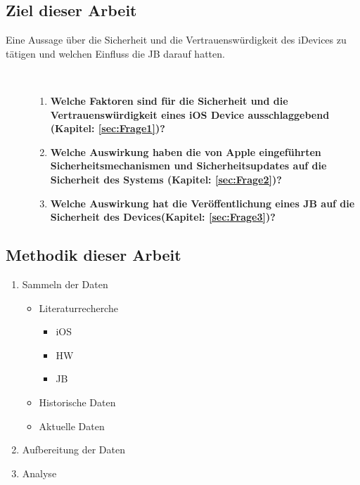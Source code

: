 \subsection{Ziel dieser Arbeit}
\label{sec:IntroZiel}
Eine Aussage über die Sicherheit und die Vertrauenswürdigkeit des iDevices zu tätigen 
und welchen Einfluss die JB darauf hatten.
    \begin{description}
        \item[\parbox{\textwidth} {Daraus ergeben sich folgende Fragestellungen}]~\par
            \begin{enumerate}
                \item \label{frage:1} \textbf{Welche Faktoren sind für die Sicherheit und die Vertrauenswürdigkeit eines iOS Device ausschlaggebend (Kapitel: \ref{sec:Frage1})? } 
                    
            \item \label{frage:2}\textbf{Welche Auswirkung haben die von Apple eingeführten Sicherheitsmechanismen und Sicherheitsupdates auf die Sicherheit des Systems (Kapitel: \ref{sec:Frage2})?} 
            
            \item \label{frage:3}\textbf{Welche Auswirkung hat die Veröffentlichung eines JB auf die Sicherheit des Devices(Kapitel: \ref{sec:Frage3})?}    
     
    \end{enumerate}
\end{description} 
 
 
\subsection{Methodik dieser Arbeit}
\label{sec:MethArbeit}

    \begin{enumerate}
        \item Sammeln der Daten
        \begin{itemize}
            \item Literaturrecherche
            \begin{itemize}
                \item iOS
                \item HW
                \item JB
            \end{itemize}
            \item Historische Daten
            \item Aktuelle Daten 
        \end{itemize}
        \item Aufbereitung der Daten
        \item Analyse 
    \end{enumerate}


